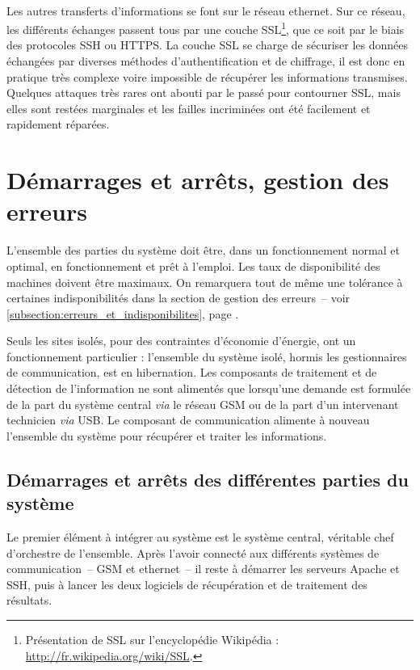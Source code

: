 \documentclass[a4paper, 11pt, final]{article}
\newcommand\fullref[1]{\ref{#1}, page \pageref{#1}}
\begin{document}
\paragraph{}
Les autres transferts d'informations se font sur le réseau
ethernet. Sur ce réseau, les différents échanges passent tous par une
couche SSL\footnote{Présentation de SSL sur l'encyclopédie Wikipédia :
\url{http://fr.wikipedia.org/wiki/SSL}.}, que ce soit par le biais des
protocoles SSH ou HTTPS. La couche SSL se charge de sécuriser les
données échangées par diverses méthodes d'authentification et de
chiffrage, il est donc en pratique très complexe voire impossible de
récupérer les informations transmises. Quelques attaques très rares
ont abouti par le passé pour contourner SSL, mais elles sont restées
marginales et les failles incriminées ont été facilement et rapidement
réparées.

\section{Démarrages et arrêts, gestion des erreurs}
L'ensemble des parties du système doit être, dans un fonctionnement
normal et optimal, en fonctionnement et prêt à l'emploi. Les taux de
disponibilité des machines doivent être maximaux. On remarquera tout
de même une tolérance à certaines indisponibilités dans la section de
gestion des erreurs~-- voir
\fullref{subsection:erreurs_et_indisponibilites}.

Seuls les sites isolés, pour des contraintes d'économie d'énergie, ont
un fonctionnement particulier : l'ensemble du système isolé, hormis
les gestionnaires de communication, est en hibernation. Les composants
de traitement et de détection de l'information ne sont alimentés que
lorsqu'une demande est formulée de la part du système central
\emph{via} le réseau GSM ou de la part d'un intervenant technicien
\emph{via} USB. Le composant de communication alimente à nouveau
l'ensemble du système pour récupérer et traiter les informations.

\subsection{Démarrages et arrêts des différentes parties du système}
Le premier élément à intégrer au système est le système central,
véritable chef d'orchestre de l'ensemble. Après l'avoir connecté aux
différents systèmes de communication~-- GSM et ethernet~-- il reste à
démarrer les serveurs Apache et SSH, puis à lancer les deux logiciels
de récupération et de traitement des résultats.
\end{document}
